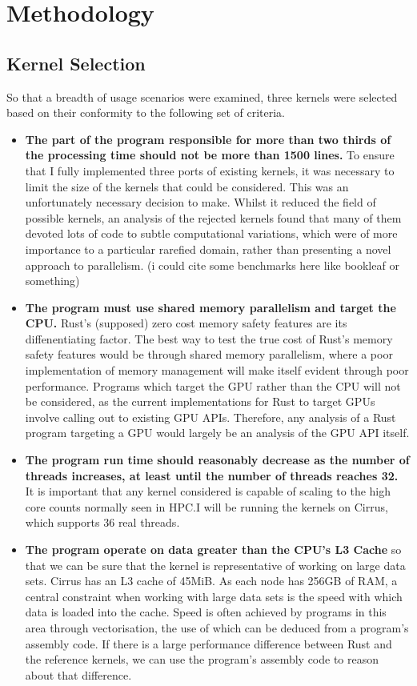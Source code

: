 \chapter{Methodology}
\section{Kernel Selection}
So that a breadth of usage scenarios were examined, three kernels were selected based on their conformity to the following set of criteria.
\begin{itemize}
  \item \textbf{The part of the program responsible for more than two thirds of the processing time should not be more than 1500 lines.} To ensure that I fully implemented three ports of existing kernels, it was necessary to limit the size of the kernels that could be considered. This was an unfortunately necessary decision to make. Whilst it reduced the field of possible kernels, an analysis of the rejected kernels found that many of them devoted lots of code to subtle computational variations, which were of more importance to a particular rarefied domain, rather than presenting a novel approach to parallelism. (i could cite some benchmarks here like bookleaf or something)

  \item \textbf{The program must use shared memory parallelism and target the CPU.} Rust's (supposed) zero cost memory safety features are its diffenentiating factor. The best way to test the true cost of Rust's memory safety features would be through shared memory parallelism, where a poor implementation of memory management will make itself evident through poor performance. Programs which target the GPU rather than the CPU will not be considered, as the current implementations for Rust to target GPUs involve calling out to existing GPU APIs. Therefore, any analysis of a Rust program targeting a GPU would largely be an analysis of the GPU API itself.

  \item \textbf{The program run time should reasonably decrease as the number of threads increases, at least until the number of threads reaches 32.} It is important that any kernel considered is capable of scaling to the high core counts normally seen in HPC.I will be running the kernels on Cirrus, which supports 36 real threads.

  \item \textbf{The program operate on data greater than the CPU's L3 Cache} so that we can be sure that the kernel is representative of working on large data sets. Cirrus has an L3 cache of 45MiB. As each node has 256GB of RAM, a central constraint when working with large data sets is the speed with which data is loaded into the cache. Speed is often achieved by programs in this area through vectorisation, the use of which can be deduced from a program's assembly code. If there is a large performance difference between Rust and the reference kernels, we can use the program's assembly code to reason about that difference.


\end{itemize}
